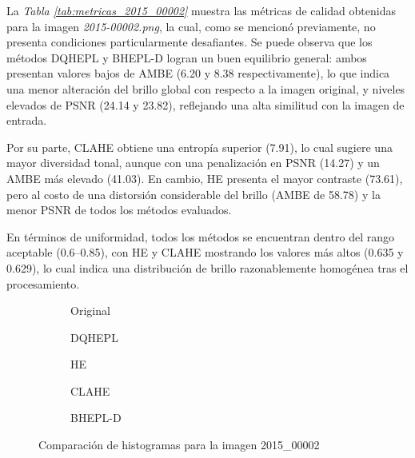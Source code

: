 \documentclass[sigchi]{acmart}
\begin{document}
La \emph{Tabla \ref{tab:metricas_2015_00002}} muestra las métricas de calidad obtenidas para la imagen
\emph{2015-00002.png}, la cual, como se mencionó previamente, no presenta condiciones particularmente
desafiantes. Se puede observa que los métodos DQHEPL y BHEPL-D logran un buen
equilibrio general: ambos presentan valores bajos de AMBE (6.20 y 8.38 respectivamente), lo que
indica una menor alteración del brillo global con respecto a la imagen original, y niveles
elevados de PSNR (24.14 y 23.82), reflejando una alta similitud con la imagen de entrada.

Por su parte, CLAHE obtiene una entropía superior (7.91), lo cual sugiere una mayor diversidad
tonal, aunque con una penalización en PSNR (14.27) y un AMBE más elevado (41.03). En cambio, HE
presenta el mayor contraste (73.61), pero al costo de una distorsión considerable del brillo
(AMBE de 58.78) y la menor PSNR de todos los métodos evaluados.

En términos de uniformidad, todos los métodos se encuentran dentro del rango aceptable
(0.6–0.85), con HE y CLAHE mostrando los valores más altos (0.635 y 0.629), lo cual indica una
distribución de brillo razonablemente homogénea tras el procesamiento.

\begin{figure}[htbp]
	\centering

	\begin{subfigure}[b]{0.45\textwidth}
		\resizebox{\linewidth}{!}{}
		\caption{Original}
		\label{fig:original_1}
	\end{subfigure}
	\hfill
	\begin{subfigure}[b]{0.45\textwidth}
		\resizebox{\linewidth}{!}{}
		\caption{DQHEPL}
		\label{fig:dqhepl_1}
	\end{subfigure}

	\begin{subfigure}[b]{0.45\textwidth}
		\resizebox{\linewidth}{!}{}
		\caption{HE}
		\label{fig:he_1}
	\end{subfigure}
	\hfill
	\begin{subfigure}[b]{0.45\textwidth}
		\resizebox{\linewidth}{!}{}
		\caption{CLAHE}
		\label{fig:clahe_1}
	\end{subfigure}

	\centering
	\begin{subfigure}[b]{0.45\textwidth}
		\resizebox{\linewidth}{!}{}
		\caption{BHEPL-D}
		\label{fig:bhepl_1}
	\end{subfigure}

	\caption{Comparación de histogramas para la imagen 2015\_00002}
	\label{fig:histogramas_1}
\end{figure}
\end{document}
